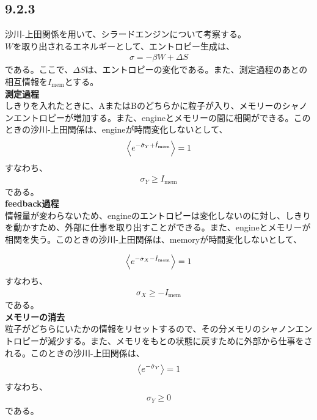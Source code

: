 \documentclass[a4paper,11pt]{jsarticle}
\numberwithin{equation}{section}
\begin{document}
\subsection*{9.2.3}
沙川-上田関係を用いて、シラードエンジンについて考察する。\\
$W$を取り出されるエネルギーとして、エントロピー生成は、
\begin{align}
    \sigma = -\beta W + \Delta S
\end{align}
である。ここで、$\Delta S$は、エントロピーの変化である。また、測定過程のあとの相互情報を$I_{\text{mem}}$とする。\\
\textbf{測定過程}\\
しきりを入れたときに、AまたはBのどちらかに粒子が入り、メモリーのシャノンエントロピーが増加する。また、engineとメモリーの間に相関ができる。このときの沙川-上田関係は、engineが時間変化しないとして、
\begin{align}
    \ev{e^{-\hat{\sigma}_Y+\hat{I}_{\text{mem}}}} = 1
\end{align}
すなわち、
\begin{align}
    \sigma_Y \geq I_{\text{mem}}
\end{align}
である。\\

\textbf{feedback過程}\\
情報量が変わらないため、engineのエントロピーは変化しないのに対し、しきりを動かすため、外部に仕事を取り出すことができる。また、engineとメモリーが相関を失う。このときの沙川-上田関係は、memoryが時間変化しないとして、

\begin{align}
    \ev{e^{-\hat{\sigma}_X-\hat{I}_{\text{mem}}}} = 1
\end{align}
すなわち、
\begin{align}
    \sigma_X \geq -I_{\text{mem}}
\end{align}
である。\\

\textbf{メモリーの消去}\\
粒子がどちらにいたかの情報をリセットするので、その分メモリのシャノンエントロピーが減少する。また、メモリをもとの状態に戻すために外部から仕事をされる。このときの沙川-上田関係は、
\begin{align}
    \ev{e^{-\hat{\sigma}_Y}} = 1
\end{align}
すなわち、
\begin{align}
    \sigma_Y \geq 0
\end{align}
である。\\
\end{document}
